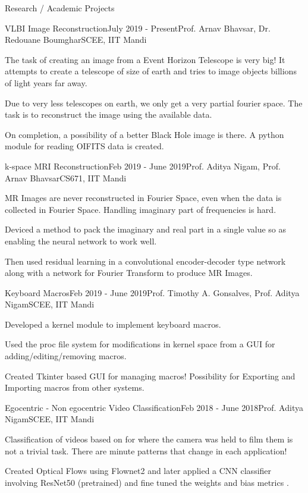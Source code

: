 \documentclass{resume} %
\begin{document}
\begin{rSection}{Research / Academic Projects}

\begin{rSubsection}{VLBI Image Reconstruction}{July 2019 - Present}{Prof. Arnav Bhavsar, Dr. Redouane Boumghar}{SCEE, IIT Mandi}
\item The task of creating an image from a Event Horizon Telescope  is very big! It attempts to create a telescope of size of earth and tries to image objects billions of light years far away.
\item  Due to very less telescopes on earth, we only get a very partial fourier space. The task is to reconstruct the image using the available data.  
\item On completion, a possibility of a better Black Hole image is there. A python module for reading OIFITS data is created.
 \end{rSubsection}

\begin{rSubsection}{k-space MRI Reconstruction}{Feb 2019 - June 2019}{Prof. Aditya Nigam, Prof. Arnav Bhavsar}{CS671, IIT Mandi}
\item MR Images are never reconstructed in Fourier Space, even when the data is collected in Fourier Space.  Handling imaginary part of frequencies is hard.
\item  Deviced a method to pack the imaginary and real part in a single value so as enabling the neural network to work well.
\item Then used residual learning in a convolutional encoder-decoder type network along with a network for Fourier Transform to produce MR Images.
 \end{rSubsection}
 
   \begin{rSubsection}{Keyboard Macros}{Feb 2019 - June 2019}{Prof. Timothy A. Gonsalves, Prof. Aditya Nigam}{SCEE, IIT Mandi}
\item Developed a kernel module to implement keyboard macros.
\item  Used the proc file system for modifications in kernel space from a GUI for adding/editing/removing macros.
\item Created Tkinter based GUI for managing macros! Possibility for Exporting and Importing macros from other systems.
 \end{rSubsection}
 

\begin{rSubsection}{Egocentric - Non egocentric Video Classification}{Feb 2018 - June 2018}{Prof. Aditya Nigam}{SCEE, IIT Mandi}
\item Classification of videos based on for where the camera was held to film them is not a trivial task. There are minute patterns that change in each application! 
\item  Created Optical Flows using Flownet2 and later applied a CNN classifier involving ResNet50 (pretrained) and fine tuned the weights and bias metrics .
 \end{rSubsection}
 

\end{rSection}
\end{document}
